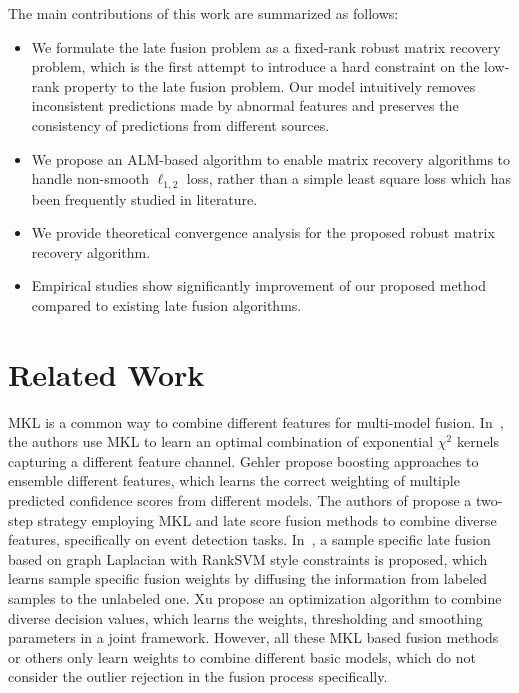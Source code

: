 \documentclass[10pt,twocolumn,letterpaper]{article}
\begin{document}
The main contributions of this work are summarized as follows:
\begin{itemize}
  \item We formulate the late fusion problem as a fixed-rank robust matrix recovery problem, which is the first attempt to introduce a hard constraint on the low-rank property to the late fusion problem.
      Our model intuitively removes inconsistent predictions made by abnormal features and preserves the consistency of predictions from different sources.
  \item We propose an ALM-based algorithm to enable matrix recovery algorithms to handle non-smooth $\ell_{1,2}$ loss, rather than a simple least square loss which has been frequently studied in literature.
  \item We provide theoretical convergence analysis for the proposed robust matrix recovery algorithm.
  \item Empirical studies show significantly improvement of our proposed method compared to existing late fusion algorithms.
\end{itemize}

\section{Related Work}

MKL is a common way to combine different features for multi-model fusion.
In~\cite{vedaldi2009multiple}, the authors use MKL to learn an optimal combination of exponential ${\chi}^2$ kernels capturing a different feature channel.
Gehler \etal \cite{gehler2009feature} propose boosting approaches to ensemble different features, which learns the correct weighting of multiple predicted confidence scores from different models.
The authors of \cite{natarajan2012multimodal} propose a two-step strategy employing MKL and late score fusion methods to combine diverse features, specifically on event detection tasks.
In~\cite{lai2015learning}, a sample specific late fusion based on graph Laplacian with RankSVM style constraints is proposed,
which learns sample specific fusion weights by diffusing the information from labeled samples to the unlabeled one.
Xu \etal \cite{xuiccv2013feature} propose an optimization algorithm to combine diverse decision values,
which learns the weights, thresholding and smoothing parameters in a joint framework.
However, all these MKL based fusion methods or others only learn weights to combine different basic models, which do not consider the outlier rejection in the fusion process specifically.
\end{document}
